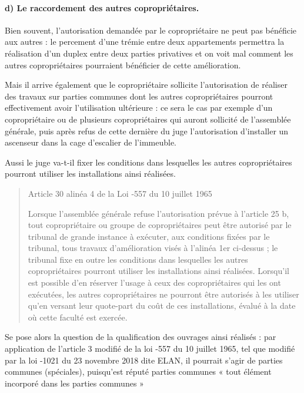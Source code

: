 			\paragraph{d) Le raccordement des autres copropriétaires.}
				
				Bien souvent, l’autorisation demandée par le copropriétaire ne peut pas bénéficie aux autres : le percement d'une trémie entre deux appartements permettra la réalisation d'un duplex entre deux parties privatives et on voit mal comment les autres copropriétaires pourraient bénéficier de cette amélioration.
				
				Mais il arrive également que le copropriétaire sollicite l'autorisation de réaliser des travaux sur parties communes dont les autres copropriétaires pourront effectivement avoir l'utilisation ultérieure : ce sera le cas par exemple d'un copropriétaire ou de plusieurs copropriétaires qui auront sollicité de l'assemblée générale, puis après refus de cette dernière du juge l'autorisation d'installer un ascenseur dans la cage d'escalier de l'immeuble.
				
				Aussi le juge va-t-il fixer les conditions dans lesquelles les autres copropriétaires pourront utiliser les installations ainsi réalisées.
				\begin{quote}
					Article 30 alinéa 4 de la Loi -557 du 10 juillet 1965
					
					Lorsque l'assemblée générale refuse l'autorisation prévue à l'article 25 b, tout copropriétaire ou groupe de copropriétaires peut être autorisé par le tribunal de grande instance à exécuter, aux conditions fixées par le tribunal, tous travaux d'amélioration visés à l'alinéa 1er ci-dessus ; le tribunal fixe en outre les conditions dans lesquelles les autres copropriétaires pourront utiliser les installations ainsi réalisées. Lorsqu'il est possible d'en réserver l'usage à ceux des copropriétaires qui les ont exécutées, les autres copropriétaires ne pourront être autorisés à les utiliser qu'en versant leur quote-part du coût de ces installations, évalué à la date où cette faculté est exercée.
				\end{quote}
				
				Se pose alors la question de la qualification des ouvrages ainsi réalisés : par application de l’article 3 modifié de la loi -557 du 10 juillet 1965, tel que modifié par la loi -1021 du 23 novembre 2018 dite ELAN, il pourrait s’agir de parties communes (spéciales), puisqu’est réputé parties communes « tout élément incorporé dans les parties communes »
		
